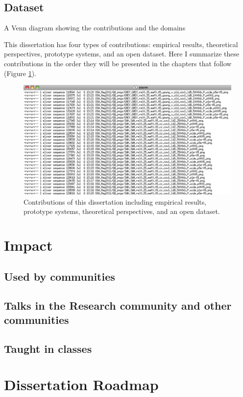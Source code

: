 \subsection{Dataset}

A Venn diagram showing the contributions and the domains

This dissertation has four types of contributions: empirical results, theoretical perspectives, prototype systems, and an open dataset. Here I summarize these contributions in the order they will be presented in the chapters that follow (Figure \ref{fig:contributions}).

\begin{figure}[t!] 
  \centering
    \includegraphics[width=1.0\textwidth]{img/files}
  \caption[Contributions of this dissertation]
{Contributions of this dissertation including empirical results, prototype systems, theoretical perspectives, and an open dataset.}
  \label{fig:contributions}
\end{figure}

\section{Impact}
 \subsection{Used by communities}
 \subsection{Talks in the Research community and other communities}
 \subsection{Taught in classes}


\section{Dissertation Roadmap}

